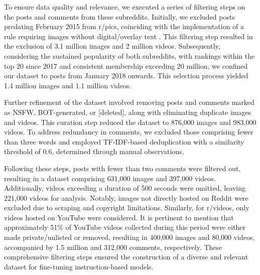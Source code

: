 
To ensure data quality and relevance, we executed a series of filtering steps on the posts and comments from these subreddits. Initially, we excluded posts predating February 2015 from r/pics, coinciding with the implementation of a rule requiring images without digital/overlay text \cite{reddit_pics_rule8,reddit_pics_wiki_index}. This filtering step resulted in the exclusion of 3.1 million images and 2 million videos. Subsequently, considering the sustained popularity of both subreddits, with rankings within the top 20 since 2017 and consistent membership exceeding 20 million, we confined our dataset to posts from January 2018 onwards. This selection process yielded 1.4 million images and 1.1 million videos.

Further refinement of the dataset involved removing posts and comments marked as NSFW, BOT-generated, or [deleted], along with eliminating duplicate images and videos. This curation step reduced the dataset to 876,000 images and 983,000 videos. To address redundancy in comments, we excluded those comprising fewer than three words and employed TF-IDF-based deduplication with a similarity threshold of 0.6, determined through manual observations.

Following these steps, posts with fewer than two comments were filtered out, resulting in a dataset comprising 631,000 images and 397,000 videos. Additionally, videos exceeding a duration of 500 seconds were omitted, leaving 221,000 videos for analysis. Notably, images not directly hosted on Reddit were excluded due to scraping and copyright limitations. Similarly, for r/videos, only videos hosted on YouTube were considered. It is pertinent to mention that approximately 51\% of YouTube videos collected during this period were either made private/unlisted or removed, resulting in 400,000 images and 80,000 videos, accompanied by 1.5 million and 312,000 comments, respectively. These comprehensive filtering steps ensured the construction of a diverse and relevant dataset for fine-tuning instruction-based models. 



